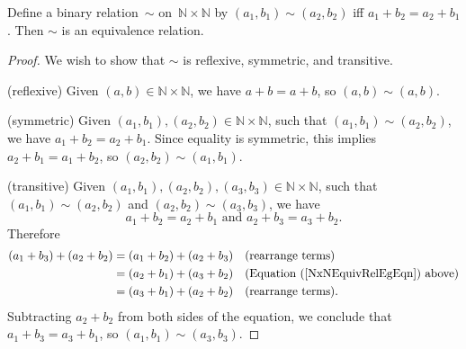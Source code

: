 \begin{eg} \label{NxNEquivRelEg}
Define a binary relation~$\sim$ on~$\mathbb{N} \times \mathbb{N}$ by $(a_1,b_1) \sim (a_2,b_2)$ iff $a_1 + b_2 = a_2 + b_1$. Then $\sim$ is an equivalence relation.

\begin{proof}
We wish to show that $\sim$ is reflexive, symmetric, and transitive.

\noindent
(reflexive) Given $(a,b) \in \mathbb{N} \times \mathbb{N}$, we have $a + b = a + b$, so $(a,b) \sim (a,b)$.

\noindent
(symmetric) Given $(a_1,b_1) , (a_2,b_2) \in \mathbb{N} \times \mathbb{N}$, such that $(a_1,b_1) \sim (a_2,b_2)$, we have $a_1 +b_2 = a_2 + b_1$. Since equality is symmetric, this implies $a_2 + b_1 = a_1 + b_2$, so $(a_2,b_2) \sim (a_1,b_1)$.

\noindent
(transitive) Given $(a_1,b_1) , (a_2,b_2) , (a_3,b_3) \in \mathbb{N} \times \mathbb{N}$, such that $(a_1,b_1) \sim (a_2,b_2)$ and $(a_2,b_2) \sim (a_3,b_3)$, we have 
\begin{equation} \label{NxNEquivRelEgEqn}
a_1 + b_2 = a_2 + b_1 \text{  and } a_2 + b_3 = a_3 + b_2.
\end{equation}
Therefore 
	\begin{align*}
	(a_1 + b_3) + (a_2 + b_2)
		&= (a_1 + b_2) + (a_2 + b_3) && \text{(rearrange terms)}
		\\&= (a_2 + b_1) + (a_3 + b_2) && \text{(Equation (\ref{NxNEquivRelEgEqn}) above)}
		\\&= (a_3 + b_1) + (a_2 + b_2) && \text{(rearrange terms)} .
	\end{align*}
Subtracting $a_2 + b_2$ from both sides of the equation, we conclude that $a_1 + b_3 = a_3 + b_1$,
so $(a_1,b_1) \sim (a_3,b_3)$.
\end{proof}
\end{eg}


